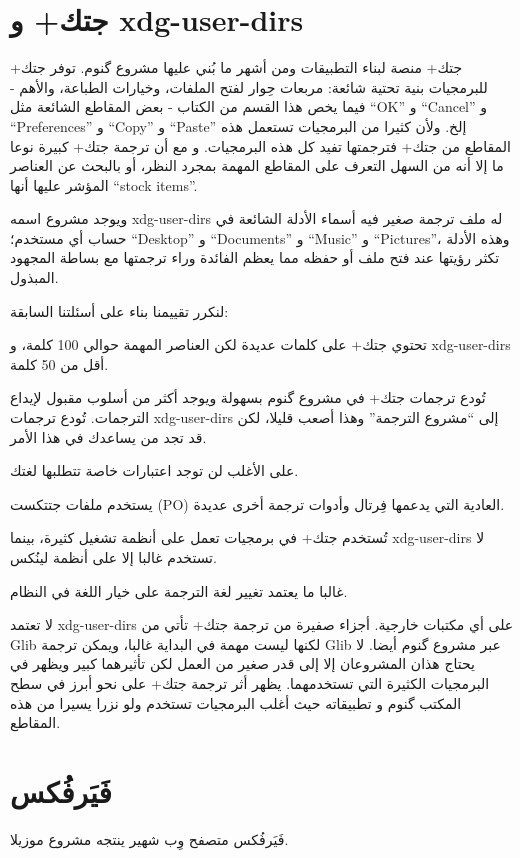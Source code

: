 
\section{جتك+ و xdg-user-dirs}
جتك+ منصة لبناء التطبيقات ومن أشهر ما بُني عليها مشروع گنوم. توفر جتك+
للبرمجيات بنية تحتية شائعة: مربعات حِوار لفتح الملفات، وخيارات الطباعة،
والأهم - فيما يخص هذا القسم من الكتاب - بعض المقاطع الشائعة مثل “OK” و
“Cancel” و “Preferences” و “Copy” و “Paste” إلخ. ولأن كثيرا من
البرمجيات تستعمل هذه المقاطع من جتك+ فترجمتها تفيد كل هذه البرمجيات. و
مع أن ترجمة جتك+ كبيرة نوعا ما إلا أنه من السهل التعرف على المقاطع
المهمة بمجرد النظر، أو بالبحث عن العناصر المؤشر عليها أنها “stock
items”.

ويوجد مشروع اسمه xdg-user-dirs له ملف ترجمة صغير فيه أسماء الأدلة
الشائعة في حساب أي مستخدم؛ “Desktop” و “Documents” و “Music” و
“Pictures”، وهذه الأدلة تكثر رؤيتها عند فتح ملف أو حفظه مما يعظم
الفائدة وراء ترجمتها مع بساطة المجهود المبذول.

لنكرر تقييمنا بناء على أسئلتنا السابقة:

\startitemize[1]
\item تحتوي جتك+ على كلمات عديدة لكن العناصر المهمة حوالي 100 كلمة، و
xdg-user-dirs أقل من 50 كلمة.
\item تُودع ترجمات جتك+ في مشروع گنوم بسهولة ويوجد أكثر من أسلوب مقبول
لإيداع الترجمات. تُودع ترجمات xdg-user-dirs إلى “مشروع الترجمة” وهذا
أصعب قليلا، لكن قد تجد من يساعدك في هذا الأمر.
\item على الأغلب لن توجد اعتبارات خاصة تتطلبها لغتك.
\item يستخدم ملفات جتتكست (PO) العادية التي يدعمها فِرتال وأدوات ترجمة
أخرى عديدة.
\item تُستخدم جتك+ في برمجيات تعمل على أنظمة تشغيل كثيرة، بينما
xdg-user-dirs لا تستخدم غالبا إلا على أنظمة لينُكس.
\item غالبا ما يعتمد تغيير لغة الترجمة على خيار اللغة في النظام.
\item لا تعتمد xdg-user-dirs على أي مكتبات خارجية. أجزاء صفيرة من ترجمة
جتك+ تأتي من Glib لكنها ليست مهمة في البداية غالبا، ويمكن ترجمة Glib
عبر مشروع گنوم أيضا.
\stopitemize
لا يحتاج هذان المشروعان إلا إلى قدر صغير من العمل لكن تأثيرهما كبير
ويظهر في البرمجيات الكثيرة التي تستخدمهما. يظهر أثر ترجمة جتك+ على نحو
أبرز في سطح المكتب گنوم و تطبيقاته حيث أغلب البرمجيات تستخدم ولو نزرا
يسيرا من هذه المقاطع.

\section{فَيَرفُكس}
فَيَرفُكس متصفح وِب شهير ينتجه مشروع موزيلا.

